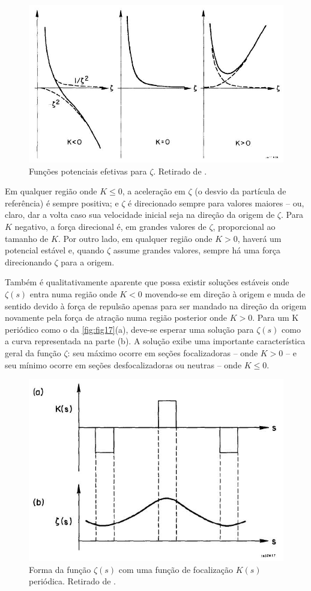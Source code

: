 \begin{figure}[!htb]
	\centering
	\includegraphics[width=0.9\linewidth]{./Figuras/fig16.jpeg}
	\caption{Funções potenciais efetivas para $\zeta$. Retirado de \cite{sands1970physics}.}
	\label{fig:fig16}
\end{figure}

Em qualquer região onde $K\leq 0$, a aceleração em $\zeta$ (o desvio da partícula de referência) é sempre positiva; e $\zeta$ é direcionado sempre para valores maiores -- ou, claro, dar a volta caso sua velocidade inicial seja na direção da origem de $\zeta$. Para $K$ negativo, a força direcional é, em grandes valores de $\zeta$, proporcional ao tamanho de $K$. Por outro lado, em qualquer região onde $K>0$, haverá um potencial estável e, quando $\zeta$ assume grandes valores, sempre há uma força direcionando $\zeta$ para a origem.

Também é qualitativamente aparente que possa existir soluções estáveis onde $\zeta(s)$ entra numa região onde $K<0$ movendo-se em direção à origem e muda de sentido devido à força de repulsão apenas para ser mandado na direção da origem novamente pela força de atração numa região posterior onde $K>0$. Para um K periódico como o da \autoref{fig:fig17}(a), deve-se esperar uma solução para $\zeta(s)$ como a curva representada na parte (b). A solução exibe uma importante característica geral da função $\zeta$: seu máximo ocorre em seções focalizadoras -- onde $K>0$ -- e seu mínimo ocorre em seções desfocalizadoras ou neutras -- onde $K \leq 0$.

\begin{figure}[!htb]
	\centering
	\includegraphics[width=0.7\linewidth]{./Figuras/fig17.jpeg}
	\caption{Forma da função $\zeta(s)$ com uma função de focalização $K(s)$ periódica. Retirado de \cite{sands1970physics}.}
	\label{fig:fig17}
\end{figure}

